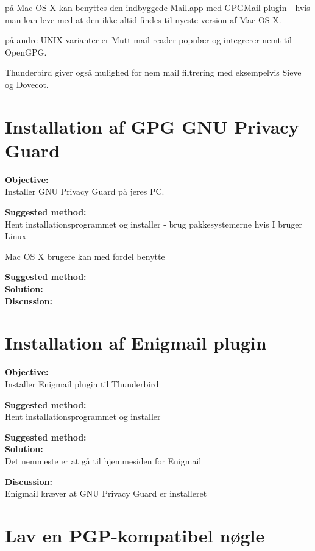 \documentclass[a4paper,11pt,notitlepage]{report}
\begin{document}
på Mac OS X kan benyttes den indbyggede Mail.app med GPGMail plugin - hvis man kan leve med at den ikke altid findes til nyeste version af Mac OS X.

på andre UNIX varianter er Mutt mail reader populær og integrerer nemt
til OpenGPG.

Thunderbird giver også mulighed for nem mail filtrering med eksempelvis Sieve og Dovecot.


\chapter{Installation af GPG GNU Privacy Guard}
\label{ex:gnupg}

{\bf Objective:}\\
Installer GNU Privacy Guard på jeres PC.

{\bf Suggested method:}\\
Hent installationsprogrammet og installer - brug pakkesystemerne hvis I bruger Linux

Mac OS X brugere kan med fordel benytte 

{\bf Suggested method:}\\

{\bf Solution:}\\

{\bf Discussion:}\\

\chapter{Installation af Enigmail plugin}
\label{ex:enigmail}

{\bf Objective:}\\
Installer Enigmail plugin til Thunderbird

{\bf Suggested method:}\\
Hent installationsprogrammet og installer

{\bf Suggested method:}\\

{\bf Solution:}\\
Det nemmeste er at gå til hjemmesiden for Enigmail


{\bf Discussion:}\\
Enigmail kræver at GNU Privacy Guard er installeret



\chapter{Lav en PGP-kompatibel nøgle}
\label{ex:generate-pgpkey}
\end{document}

